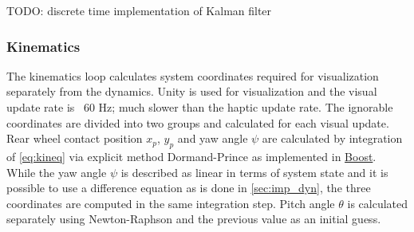 \documentclass[11pt,a4paper,reqno]{amsart}
\newcommand{\x}{x_{p}}
\newcommand{\y}{y_{p}}
\newcommand{\pitch}{\theta}
\newcommand{\yaw}{\psi}
\begin{document}
TODO: discrete time implementation of Kalman filter

\subsubsection{Kinematics}
The kinematics loop calculates system coordinates required for visualization separately from the dynamics.
Unity is used for visualization and the visual update rate is ~60 Hz; much slower than the haptic update rate.
The ignorable coordinates are divided into two groups and calculated for each visual update.
Rear wheel contact position $ \x $, $ \y $ and yaw angle $ \yaw $ are calculated by integration of \autoref{eq:kineq}
via explicit method Dormand-Prince as implemented in \href{http://www.boost.org/}{Boost}.
While the yaw angle $ \yaw $ is described as linear in terms of system state and it is possible to use a difference
equation as is done in \autoref{sec:imp_dyn}, the three coordinates are computed in the same integration step.
Pitch angle $ \pitch $ is calculated separately using Newton-Raphson and the previous value as an initial guess.

\end{document}
